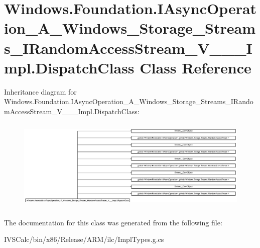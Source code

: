 \hypertarget{class_windows_1_1_foundation_1_1_i_async_operation___a___windows___storage___streams___i_random_c8dca1314455b4702852f5e1bc599e2e}{}\section{Windows.\+Foundation.\+I\+Async\+Operation\+\_\+\+A\+\_\+\+Windows\+\_\+\+Storage\+\_\+\+Streams\+\_\+\+I\+Random\+Access\+Stream\+\_\+\+V\+\_\+\+\_\+\+\_\+\+Impl.\+Dispatch\+Class Class Reference}
\label{class_windows_1_1_foundation_1_1_i_async_operation___a___windows___storage___streams___i_random_c8dca1314455b4702852f5e1bc599e2e}
Inheritance diagram for Windows.\+Foundation.\+I\+Async\+Operation\+\_\+\+A\+\_\+\+Windows\+\_\+\+Storage\+\_\+\+Streams\+\_\+\+I\+Random\+Access\+Stream\+\_\+\+V\+\_\+\+\_\+\+\_\+\+Impl.\+Dispatch\+Class\+:\begin{figure}[H]
\begin{center}
\leavevmode
\includegraphics[height=4.457308cm]{class_windows_1_1_foundation_1_1_i_async_operation___a___windows___storage___streams___i_random_c8dca1314455b4702852f5e1bc599e2e}
\end{center}
\end{figure}


The documentation for this class was generated from the following file\+:\begin{DoxyCompactItemize}
\item 
I\+V\+S\+Calc/bin/x86/\+Release/\+A\+R\+M/ilc/Impl\+Types.\+g.\+cs\end{DoxyCompactItemize}
